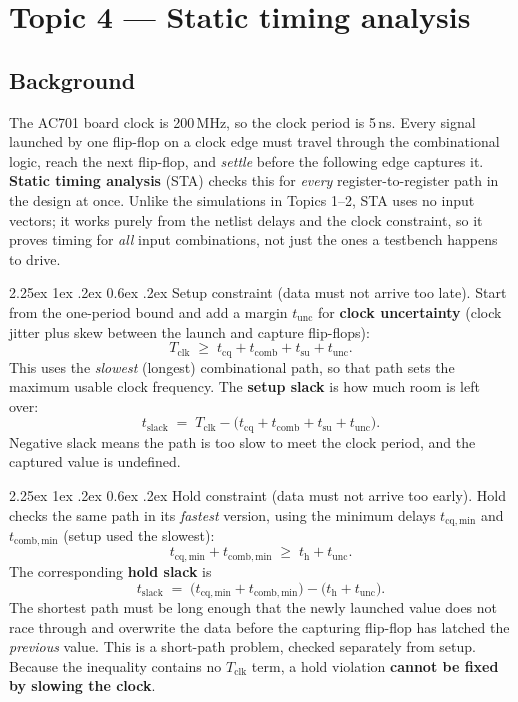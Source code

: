 \documentclass[11pt]{article}
\makeatletter
\renewcommand{\_}{\textunderscore\allowbreak}
\renewcommand\paragraph{\@startsection{paragraph}{4}{\z@}%
  {2.25ex \@plus 1ex \@minus .2ex}%
  {0.6ex \@plus .2ex}%
  {\normalfont\normalsize\bfseries}}
\makeatother
\begin{document}
\newpage
\section{Topic 4 --- Static timing analysis}

\subsection{Background}
The AC701 board clock is 200\,MHz, so the clock period is 5\,ns. Every signal launched by one flip-flop on a
clock edge must travel through the combinational logic, reach the next flip-flop, and \emph{settle} before
the following edge captures it. \textbf{Static timing analysis} (STA) checks this for \emph{every}
register-to-register path in the design at once. Unlike the simulations in Topics 1--2, STA uses no input
vectors; it works purely from the netlist delays and the clock constraint, so it proves timing for
\emph{all} input combinations, not just the ones a testbench happens to drive.

\paragraph{Setup constraint (data must not arrive too late).}
Start from the one-period bound and add a margin $t_{\mathrm{unc}}$ for \textbf{clock uncertainty} (clock
jitter plus skew between the launch and capture flip-flops):
\[
  T_{\mathrm{clk}} \;\ge\; t_{\mathrm{cq}} + t_{\mathrm{comb}} + t_{\mathrm{su}} + t_{\mathrm{unc}}.
\]
This uses the \emph{slowest} (longest) combinational path, so that path sets the maximum usable clock
frequency. The \textbf{setup slack} is how much room is left over:
\[
  t_{\mathrm{slack}} \;=\; T_{\mathrm{clk}} - \bigl(t_{\mathrm{cq}} + t_{\mathrm{comb}} + t_{\mathrm{su}}
  + t_{\mathrm{unc}}\bigr).
\]
Negative slack means the path is too slow to meet the clock period, and the captured value is undefined.

\paragraph{Hold constraint (data must not arrive too early).}
Hold checks the same path in its \emph{fastest} version, using the minimum delays $t_{\mathrm{cq,min}}$ and
$t_{\mathrm{comb,min}}$ (setup used the slowest):
\[
  t_{\mathrm{cq,min}} + t_{\mathrm{comb,min}} \;\ge\; t_{\mathrm{h}} + t_{\mathrm{unc}}.
\]
The corresponding \textbf{hold slack} is
\[
  t_{\mathrm{slack}} \;=\; \bigl(t_{\mathrm{cq,min}} + t_{\mathrm{comb,min}}\bigr)
  - \bigl(t_{\mathrm{h}} + t_{\mathrm{unc}}\bigr).
\]
The shortest path must be long enough that the newly launched value does not race through and overwrite the
data before the capturing flip-flop has latched the \emph{previous} value. This is a short-path problem,
checked separately from setup. Because the inequality contains no $T_{\mathrm{clk}}$ term, a hold violation
\textbf{cannot be fixed by slowing the clock}.
\end{document}
